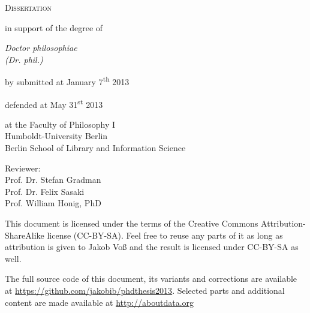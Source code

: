
\renewcommand{\thepage}{\roman{page}}

\makeatletter

\begin{titlepage}

\begin{center}
\vfill

{\bfseries
  {\huge\strut\ignorespaces\@title\par}
  {\large\strut\ignorespaces\@subtitle\par}
}\vfill

{\huge\textsc{Dissertation}}\par
{\large in support of the degree of\par
{}\baselineskip
{\it Doctor philosophiae\\(Dr. phil.)} \par
{}\baselineskip
by \@author
{}\baselineskip
submitted at January 7\textsuperscript{th} 2013\par
defended at May 31\textsuperscript{st} 2013\par
{}\baselineskip
at the Faculty of Philosophy I\\
Humboldt-University Berlin\\
Berlin School of Library and Information Science\par
{}\baselineskip
Reviewer:\\
Prof. Dr. Stefan Gradman \\
Prof. Dr. Felix Sasaki \\
Prof. William Honig, PhD
}
\end{center}

\pagebreak
\thispagestyle{empty}
\vfill

\noindent This document is licensed under the terms of the Creative Commons
Attribution-ShareAlike license (CC-BY-SA). Feel free to reuse any parts of it
as long as attribution is given to Jakob Vo\ss{} and the result is licensed under
CC-BY-SA as well.

\baselineskip

\noindent
The full source code of this document, its variants and corrections are
available at \url{https://github.com/jakobib/phdthesis2013}.  Selected parts
and additional content are made available at \url{http://aboutdata.org}


\end{titlepage}
